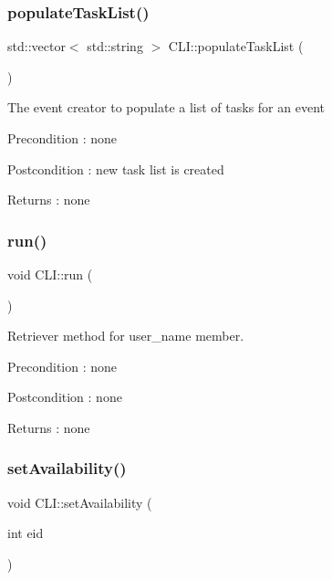 \subsubsection{\texorpdfstring{populate\+Task\+List()}{populateTaskList()}}
{\footnotesize\ttfamily std\+::vector$<$ std\+::string $>$ C\+L\+I\+::populate\+Task\+List (\begin{DoxyParamCaption}{ }\end{DoxyParamCaption})}

The event creator to populate a list of tasks for an event \begin{DoxyPrecond}{Precondition}
\+: none 
\end{DoxyPrecond}
\begin{DoxyPostcond}{Postcondition}
\+: new task list is created 
\end{DoxyPostcond}
\begin{DoxyReturn}{Returns}
\+: none 
\end{DoxyReturn}
\mbox{\label{class_c_l_i_aeefc8cd81999836a90c2cfaced6177f1}} 
\subsubsection{\texorpdfstring{run()}{run()}}
{\footnotesize\ttfamily void C\+L\+I\+::run (\begin{DoxyParamCaption}{ }\end{DoxyParamCaption})}

Retriever method for user\+\_\+name member. \begin{DoxyPrecond}{Precondition}
\+: none 
\end{DoxyPrecond}
\begin{DoxyPostcond}{Postcondition}
\+: none 
\end{DoxyPostcond}
\begin{DoxyReturn}{Returns}
\+: none 
\end{DoxyReturn}
\mbox{\label{class_c_l_i_a0546e36efd50af1c80eee2ed47ac4f12}} 
\subsubsection{\texorpdfstring{set\+Availability()}{setAvailability()}}
{\footnotesize\ttfamily void C\+L\+I\+::set\+Availability (\begin{DoxyParamCaption}\item[{int}]{eid }\end{DoxyParamCaption})}


